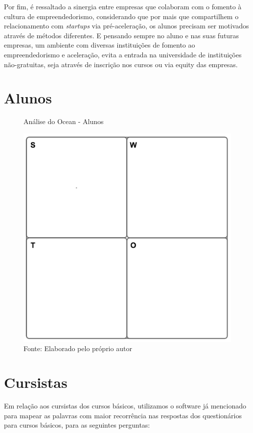 Por fim, é ressaltado a sinergia entre empresas que colaboram com o fomento à cultura de empreendedorismo, considerando que por mais que compartilhem o relacionamento com \textit{startups} via pré-aceleração, os alunos precisam ser motivados através de métodos diferentes. E pensando sempre no aluno e nas suas futuras empresas, um ambiente com diversas instituições de fomento ao empreendedorismo e aceleração, evita a entrada na universidade de instituições não-gratuitas, seja através de inscrição nos cursos ou via equity das empresas.

\section{Alunos}

\begin{figure}[H]
\caption{Análise do Ocean - Alunos}
\centerline{\includegraphics[scale=0.75]{img/generalswot}}
\label{fig:swotalunos}
\caption* {Fonte: Elaborado pelo próprio autor}
\end{figure}

\section{Cursistas}

Em relação aos cursistas dos cursos básicos, utilizamos o software já mencionado para mapear as palavras com maior recorrência nas respostas dos questionários para cursos básicos, para as seguintes perguntas:

